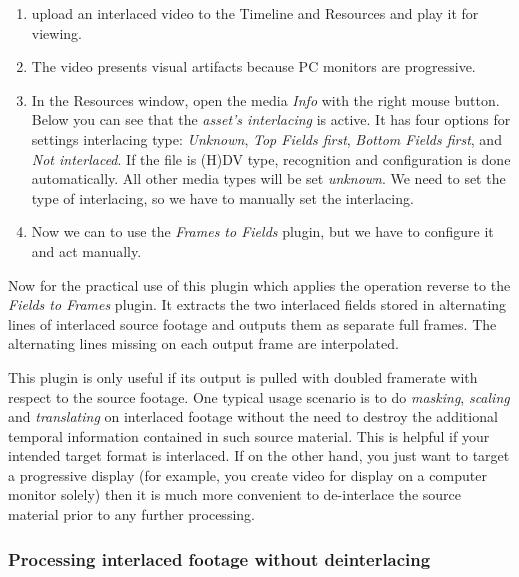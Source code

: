 \begin{enumerate}
    \item upload an interlaced video to the Timeline and Resources and play it for viewing.
    \item The video presents visual artifacts because PC monitors are progressive.
    \item In the Resources window, open the media \textit{Info} with the right mouse button. Below you can see that the \textit{asset's interlacing} is active. It has four options for settings interlacing type: \textit{Unknown}, \textit{Top Fields first}, \textit{Bottom Fields first}, and \textit{Not interlaced}. If the file is (H)DV type, recognition and configuration is done automatically. All other media types will be set \textit{unknown}. We need to set the type of interlacing, so we have to manually set the interlacing.
    \item Now we can to use the \textit{Frames to Fields} plugin, but we have to configure it and act manually.
\end{enumerate}

Now for the practical use of this plugin which applies the operation reverse to the \textit{Fields to Frames} plugin. It extracts the two interlaced fields stored in alternating lines of interlaced source footage and outputs them as separate full frames. The alternating lines missing on each output frame are interpolated.

This plugin is only useful if its output is pulled with doubled framerate with respect to the source footage. One typical usage scenario is to do \textit{masking}, \textit{scaling} and \textit{translating} on interlaced footage without the need to destroy the additional temporal information contained in such source material. This is helpful if your intended target format is interlaced. If on the other hand, you just want to target a progressive display (for example, you create video for display on a computer monitor solely) then it is much more convenient to de-interlace the source material prior to any further processing.

\subsubsection*{Processing interlaced footage without deinterlacing}
\label{ssub:processing_interlace_footage}

